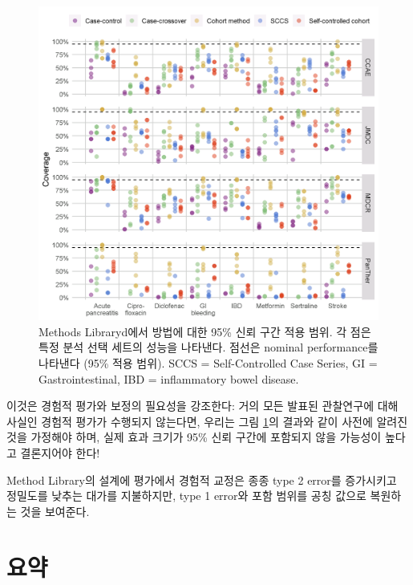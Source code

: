 \documentclass[11pt]{book}
\theoremstyle{definition}
\theoremstyle{definition}
\theoremstyle{definition}
\theoremstyle{remark}
\begin{document}
\begin{figure}[h]

{\centering \includegraphics[width=1\linewidth]{images/MethodValidity/methodEval} 

}

\caption{Methods Libraryd에서 방법에 대한 95\% 신뢰 구간 적용 범위. 각 점은 특정 분석 선택 세트의 성능을 나타낸다. 점선은 nominal performance를 나타낸다 (95\% 적용 범위). SCCS = Self-Controlled Case Series, GI = Gastrointestinal, IBD = inflammatory bowel disease.}\label{fig:methodEval}
\end{figure}

이것은 경험적 평가와 보정의 필요성을 강조한다: 거의 모든 발표된
관찰연구에 대해 사실인 경험적 평가가 수행되지 않는다면, 우리는 그림
\ref{fig:methodEval}의 결과와 같이 사전에 알려진 것을 가정해야 하며,
실제 효과 크기가 95\% 신뢰 구간에 포함되지 않을 가능성이 높다고
결론지어야 한다!

Method Library의 설계에 평가에서 경험적 교정은 종종 type 2 error를
증가시키고 정밀도를 낮추는 대가를 지불하지만, type 1 error와 포함 범위를
공칭 값으로 복원하는 것을 보여준다.

\section{요약}\label{-16}
\end{document}
